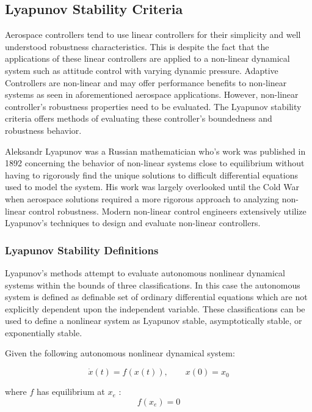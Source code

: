 \subsection{Lyapunov Stability Criteria}

Aerospace controllers tend to use linear controllers for their simplicity and well understood robustness characteristics.  This is despite the fact that the applications of these linear controllers are applied to a non-linear dynamical system such as attitude control with varying dynamic pressure.  Adaptive Controllers are non-linear and may offer performance benefits to non-linear systems as seen in aforementioned aerospace applications.  However, non-linear controller's robustness properties need to be evaluated.  The Lyapunov stability criteria offers methods of evaluating these controller's boundedness and robustness behavior.

Aleksandr Lyapunov was a Russian mathematician who's work was published in 1892 \cite{lyapunov1892general} concerning the behavior of non-linear systems close to equilibrium without having to rigorously find the unique solutions to difficult differential equations used to model the system.  His work was largely overlooked until the Cold War when aerospace solutions required a more rigorous approach to analyzing non-linear control robustness.  Modern non-linear control engineers extensively utilize Lyapunov's techniques to design and evaluate non-linear controllers.

\subsubsection{Lyapunov Stability Definitions}

Lyapunov's methods attempt to evaluate autonomous nonlinear dynamical systems within the bounds of three classifications.  In this case the autonomous system is defined as definable set of ordinary differential equations which are not explicitly dependent upon the independent variable.  These classifications can be used to define a nonlinear system as Lyapunov stable, asymptotically stable, or exponentially stable.

Given the following autonomous nonlinear dynamical system:

 \begin{equation}
\dot{x}(t)=f(x(t)), \qquad x(0)=x_0
\end{equation}

where $f$ has equilibrium at $x_e$ :
 \begin{equation}
f(x_e) = 0
\end{equation}

